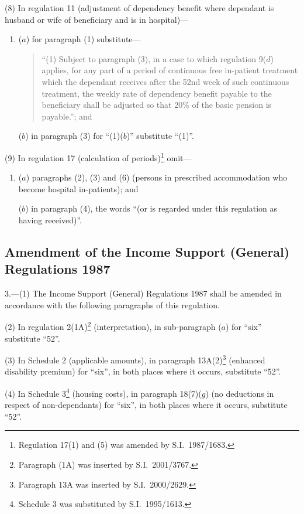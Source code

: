 \documentclass[12pt,a4paper]{article}
\begin{document}
(8) In regulation 11 (adjustment of dependency benefit where dependant is husband or wife of beneficiary and is in hospital)—
\begin{enumerate}\item[]
($a$) for paragraph (1) substitute—
\begin{quotation}
“(1) Subject to paragraph (3), in a case to which regulation 9($d$)  applies, for any part of a period of continuous free in-patient treatment which the dependant receives after the 52nd week of such continuous treatment, the weekly rate of dependency benefit payable to the beneficiary shall be adjusted so that 20\% of the basic pension is payable.”; and
\end{quotation}

($b$) in paragraph (3) for “(1)($b$)” substitute “(1)”.
\end{enumerate}

(9) In regulation 17 (calculation of periods)\footnote{Regulation 17(1) and (5) was amended by S.I.\ 1987/1683.} omit—
\begin{enumerate}\item[]
($a$) paragraphs (2), (3) and (6) (persons in prescribed accommodation who become hospital in-patients); and

($b$) in paragraph (4), the words “(or is regarded under this regulation as having received)”.
\end{enumerate}

\subsection[3. Amendment of the Income Support (General) Regulations 1987]{\sloppy Amendment of the Income Support (General) Regulations 1987}

3.---(1)  The Income Support (General) Regulations 1987 shall be amended in accordance with the following paragraphs of this regulation.

(2) In regulation 2(1A)\footnote{Paragraph (1A) was inserted by S.I.\ 2001/3767.} (interpretation), in sub-paragraph ($a$)  for “six” substitute “52”.

(3) In Schedule 2 (applicable amounts), in paragraph 13A(2)\footnote{Paragraph 13A was inserted by S.I.\ 2000/2629.} (enhanced disability premium) for “six”, in both places where it occurs, substitute “52”.

(4) In Schedule 3\footnote{Schedule 3 was substituted by S.I.\ 1995/1613.} (housing costs), in paragraph 18(7)($g$)  (no deductions in respect of non-dependants) for “six”, in both places where it occurs, substitute “52”.
\end{document}
